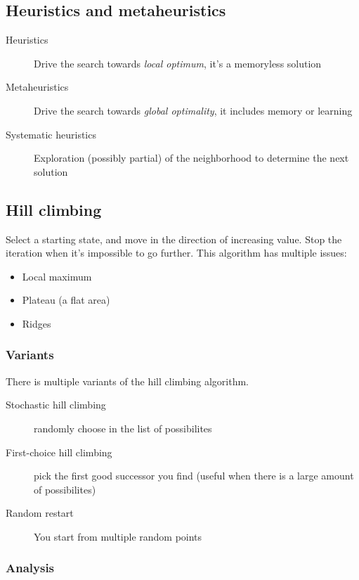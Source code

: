 \subsection{Heuristics and metaheuristics}

\begin{description}
\item[Heuristics] Drive the search towards \textit{local optimum}, it's a memoryless solution
\item[Metaheuristics] Drive the search towards \textit{global optimality}, it includes memory or learning
\item[Systematic heuristics] Exploration (possibly partial) of the neighborhood to determine the next solution
\end{description}

\subsection{Hill climbing}

Select a starting state, and move in the direction of increasing value. Stop the iteration when it's impossible to go further. This algorithm has multiple issues:
\begin{itemize}
\item Local maximum
\item Plateau (a flat area)
\item Ridges
\end{itemize}

\subsubsection{Variants}

There is multiple variants of the hill climbing algorithm.
\begin{description}
\item[Stochastic hill climbing] randomly choose in the list of possibilites
\item[First-choice hill climbing] pick the first good successor you find (useful when there is a large amount of possibilites)
\item[Random restart] You start from multiple random points
\end{description}

\subsubsection{Analysis}

